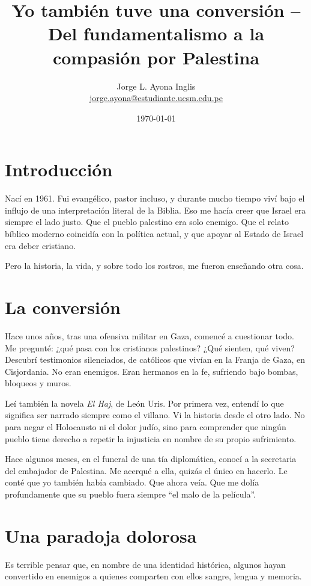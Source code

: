 \documentclass[12pt]{article}
\title{\textbf{Yo también tuve una conversión – Del fundamentalismo a la compasión por Palestina}}
\author{Jorge L. Ayona Inglis\\\href{mailto:jorge.ayona@estudiante.ucsm.edu.pe}{jorge.ayona@estudiante.ucsm.edu.pe}}
\date{\today}
\begin{document}
\maketitle

\section*{Introducción}

Nací en 1961. Fui evangélico, pastor incluso, y durante mucho tiempo viví bajo el influjo de una interpretación literal de la Biblia. Eso me hacía creer que Israel era siempre el lado justo. Que el pueblo palestino era solo enemigo. Que el relato bíblico moderno coincidía con la política actual, y que apoyar al Estado de Israel era deber cristiano.

Pero la historia, la vida, y sobre todo los rostros, me fueron enseñando otra cosa.

\section*{La conversión}

Hace unos años, tras una ofensiva militar en Gaza, comencé a cuestionar todo. Me pregunté: ¿qué pasa con los cristianos palestinos? ¿Qué sienten, qué viven? Descubrí testimonios silenciados, de católicos que vivían en la Franja de Gaza, en Cisjordania. No eran enemigos. Eran hermanos en la fe, sufriendo bajo bombas, bloqueos y muros.

Leí también la novela \textit{El Haj}, de León Uris. Por primera vez, entendí lo que significa ser narrado siempre como el villano. Vi la historia desde el otro lado. No para negar el Holocausto ni el dolor judío, sino para comprender que ningún pueblo tiene derecho a repetir la injusticia en nombre de su propio sufrimiento.

Hace algunos meses, en el funeral de una tía diplomática, conocí a la secretaria del embajador de Palestina. Me acerqué a ella, quizás el único en hacerlo. Le conté que yo también había cambiado. Que ahora veía. Que me dolía profundamente que su pueblo fuera siempre “el malo de la película”.

\section*{Una paradoja dolorosa}

Es terrible pensar que, en nombre de una identidad histórica, algunos hayan convertido en enemigos a quienes comparten con ellos sangre, lengua y memoria.
\end{document}
